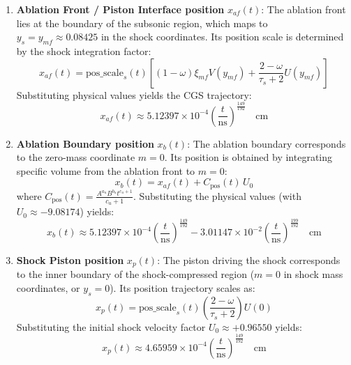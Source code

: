\documentclass[11pt]{article}
\begin{document}
\begin{enumerate}
    \item \textbf{Ablation Front / Piston Interface position} $x_{af}(t)$:
    The ablation front lies at the boundary of the subsonic region, which maps to $y_s = y_{mf} \approx 0.08425$ in the shock coordinates. Its position scale is determined by the shock integration factor:
    \begin{equation}
        x_{af}(t) = \text{pos\_scale}_s(t) \left[ (1-\omega)\xi_{mf} V(y_{mf}) + \frac{2-\omega}{\tau_s+2} U(y_{mf}) \right]
    \end{equation}
    Substituting physical values yields the CGS trajectory:
    \begin{equation}
        x_{af}(t) \approx 5.12397 \times 10^{-4} \left(\frac{t}{\text{ns}}\right)^{\frac{149}{192}} \quad \text{cm}
    \end{equation}

    \item \textbf{Ablation Boundary position} $x_b(t)$:
    The ablation boundary corresponds to the zero-mass coordinate $m=0$. Its position is obtained by integrating specific volume from the ablation front to $m=0$:
    \begin{equation}
        x_b(t) = x_{af}(t) + C_{\text{pos}}(t) \, U_0
    \end{equation}
    where $C_{\text{pos}}(t) = \frac{A^{a_u} B^{b_u} t^{c_u+1}}{c_u+1}$. Substituting the physical values (with $U_0 \approx -9.08174$) yields:
    \begin{equation}
        x_b(t) \approx 5.12397 \times 10^{-4} \left(\frac{t}{\text{ns}}\right)^{\frac{149}{192}} - 3.01147 \times 10^{-2} \left(\frac{t}{\text{ns}}\right)^{\frac{199}{192}} \quad \text{cm}
    \end{equation}

    \item \textbf{Shock Piston position} $x_p(t)$:
    The piston driving the shock corresponds to the inner boundary of the shock-compressed region ($m = 0$ in shock mass coordinates, or $y_s = 0$). Its position trajectory scales as:
    \begin{equation}
        x_p(t) = \text{pos\_scale}_s(t) \left( \frac{2-\omega}{\tau_s+2} \right) U(0)
    \end{equation}
    Substituting the initial shock velocity factor $U_0 \approx + 0.96550$ yields:
    \begin{equation}
        x_p(t) \approx 4.65959 \times 10^{-4} \left(\frac{t}{\text{ns}}\right)^{\frac{149}{192}} \quad \text{cm}
    \end{equation}


\end{enumerate}
\end{document}
